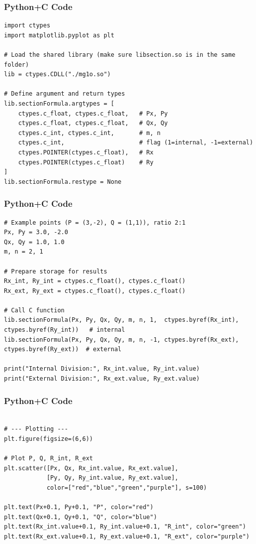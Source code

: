 \documentclass{beamer}
\begin{document}
\begin{frame}[fragile]
    \frametitle{Python+C Code}
    \begin{lstlisting}
import ctypes
import matplotlib.pyplot as plt

# Load the shared library (make sure libsection.so is in the same folder)
lib = ctypes.CDLL("./mg1o.so")

# Define argument and return types
lib.sectionFormula.argtypes = [
    ctypes.c_float, ctypes.c_float,   # Px, Py
    ctypes.c_float, ctypes.c_float,   # Qx, Qy
    ctypes.c_int, ctypes.c_int,       # m, n
    ctypes.c_int,                     # flag (1=internal, -1=external)
    ctypes.POINTER(ctypes.c_float),   # Rx
    ctypes.POINTER(ctypes.c_float)    # Ry
]
lib.sectionFormula.restype = None
 \end{lstlisting}
\end{frame}
\begin{frame}[fragile]
    \frametitle{Python+C Code}
    \begin{lstlisting}
# Example points (P = (3,-2), Q = (1,1)), ratio 2:1
Px, Py = 3.0, -2.0
Qx, Qy = 1.0, 1.0
m, n = 2, 1

# Prepare storage for results
Rx_int, Ry_int = ctypes.c_float(), ctypes.c_float()
Rx_ext, Ry_ext = ctypes.c_float(), ctypes.c_float()

# Call C function
lib.sectionFormula(Px, Py, Qx, Qy, m, n, 1,  ctypes.byref(Rx_int), ctypes.byref(Ry_int))   # internal
lib.sectionFormula(Px, Py, Qx, Qy, m, n, -1, ctypes.byref(Rx_ext), ctypes.byref(Ry_ext))  # external

print("Internal Division:", Rx_int.value, Ry_int.value)
print("External Division:", Rx_ext.value, Ry_ext.value)
\end{lstlisting}
\end{frame}
\begin{frame}[fragile]
    \frametitle{Python+C Code}
    \begin{lstlisting}

# --- Plotting ---
plt.figure(figsize=(6,6))

# Plot P, Q, R_int, R_ext
plt.scatter([Px, Qx, Rx_int.value, Rx_ext.value],
            [Py, Qy, Ry_int.value, Ry_ext.value],
            color=["red","blue","green","purple"], s=100)

plt.text(Px+0.1, Py+0.1, "P", color="red")
plt.text(Qx+0.1, Qy+0.1, "Q", color="blue")
plt.text(Rx_int.value+0.1, Ry_int.value+0.1, "R_int", color="green")
plt.text(Rx_ext.value+0.1, Ry_ext.value+0.1, "R_ext", color="purple")
    \end{lstlisting}
\end{frame}
\end{document}

